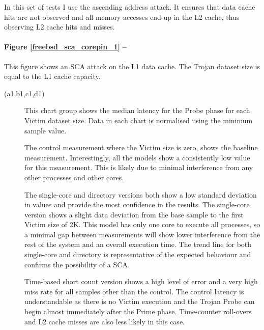 		In this set of tests I use the ascending address attack. It ensures that data cache hits are not observed and all memory accesses end-up in the L2 cache, thus observing L2 cache hits and misses. 

\clearpage
		\paragraph{Figure \ref{freebsd_sca_corepin_1} --}
			This figure shows an SCA attack on the L1 data cache. The Trojan dataset size is equal to the L1 cache capacity.
			\begin{description}
			\item [(a1,b1,c1,d1)] 
				This chart group shows the median latency for the Probe phase for each Victim dataset size. Data in each chart is normalised using the minimum sample value. 
				
				The control measurement where the Victim size is zero, shows the baseline measurement. Interestingly, all the models show a consistently low value for this measurement. This is likely due to minimal interference from any other processes and other cores. 
				
				The single-core and directory versions both show a low standard deviation in values and provide the most confidence in the results. The single-core version shows a slight data deviation from the base sample to the first Victim size of 2K. This model has only one core to execute all processes, so a minimal gap between measurements will show lower interference from the rest of the system and an overall execution time. The trend line for both single-core and directory is representative of the expected behaviour and confirms the possibility of a SCA.
				
				Time-based short count version shows a high level of error and a very high miss rate for all samples other than the control. The control latency is understandable as there is no Victim execution and the Trojan Probe can begin almost immediately after the Prime phase.
				Time-counter roll-overs and L2 cache misses are also less likely in this case. 
				

\end{description}
